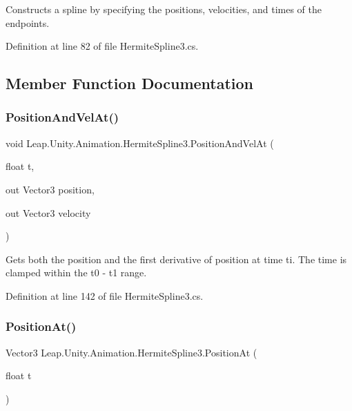 Constructs a spline by specifying the positions, velocities, and times of the endpoints. 



Definition at line 82 of file Hermite\+Spline3.\+cs.



\subsection{Member Function Documentation}
\mbox{\label{struct_leap_1_1_unity_1_1_animation_1_1_hermite_spline3_ab81840b44bc65f6ba0be418786f8bcff}} 
\subsubsection{\texorpdfstring{PositionAndVelAt()}{PositionAndVelAt()}}
{\footnotesize\ttfamily void Leap.\+Unity.\+Animation.\+Hermite\+Spline3.\+Position\+And\+Vel\+At (\begin{DoxyParamCaption}\item[{float}]{t,  }\item[{out Vector3}]{position,  }\item[{out Vector3}]{velocity }\end{DoxyParamCaption})}



Gets both the position and the first derivative of position at time ti. The time is clamped within the t0 -\/ t1 range. 



Definition at line 142 of file Hermite\+Spline3.\+cs.

\mbox{\label{struct_leap_1_1_unity_1_1_animation_1_1_hermite_spline3_a69154d96fa6d61cfa7907ad30cc84c12}} 
\subsubsection{\texorpdfstring{PositionAt()}{PositionAt()}}
{\footnotesize\ttfamily Vector3 Leap.\+Unity.\+Animation.\+Hermite\+Spline3.\+Position\+At (\begin{DoxyParamCaption}\item[{float}]{t }\end{DoxyParamCaption})}



